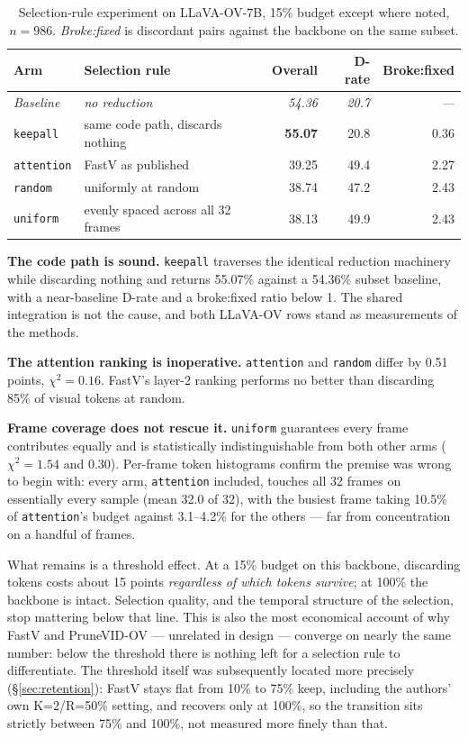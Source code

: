 \documentclass[11pt]{article}
\begin{document}
\begin{table}[H]
  \centering
  \small
  \caption{Selection-rule experiment on LLaVA-OV-7B, 15\% budget except
  where noted, $n=986$. \emph{Broke:fixed} is discordant pairs against the
  backbone on the same subset.}
  \label{tab:selection}
  \begin{tabular}{llrrr}
    \toprule
    Arm & Selection rule & Overall & D-rate & Broke:fixed \\
    \midrule
    \textit{Baseline} & \textit{no reduction} & \textit{54.36} & \textit{20.7} & \textit{---} \\
    \texttt{keepall} & same code path, discards nothing & \textbf{55.07} & 20.8 & 0.36 \\
    \midrule
    \texttt{attention} & FastV as published & 39.25 & 49.4 & 2.27 \\
    \texttt{random} & uniformly at random & 38.74 & 47.2 & 2.43 \\
    \texttt{uniform} & evenly spaced across all 32 frames & 38.13 & 49.9 & 2.43 \\
    \bottomrule
  \end{tabular}
\end{table}

\textbf{The code path is sound.} \texttt{keepall} traverses the identical
reduction machinery while discarding nothing and returns 55.07\% against a
54.36\% subset baseline, with a near-baseline D-rate and a broke:fixed ratio
below 1. The shared integration is not the cause, and both LLaVA-OV rows
stand as measurements of the methods.

\textbf{The attention ranking is inoperative.} \texttt{attention} and
\texttt{random} differ by 0.51 points, $\chi^2 = 0.16$. FastV's layer-2
ranking performs no better than discarding 85\% of visual tokens at random.

\textbf{Frame coverage does not rescue it.} \texttt{uniform} guarantees
every frame contributes equally and is statistically indistinguishable from
both other arms ($\chi^2 = 1.54$ and $0.30$). Per-frame token histograms
confirm the premise was wrong to begin with: every arm, \texttt{attention}
included, touches all 32 frames on essentially every sample (mean 32.0 of
32), with the busiest frame taking 10.5\% of \texttt{attention}'s budget
against 3.1--4.2\% for the others --- far from concentration on a handful of
frames.

What remains is a threshold effect. At a 15\% budget on this backbone,
discarding tokens costs about 15 points \emph{regardless of which tokens
survive}; at 100\% the backbone is intact. Selection quality, and the
temporal structure of the selection, stop mattering below that line. This is
also the most economical account of why FastV and PruneVID-OV --- unrelated
in design --- converge on nearly the same number: below the threshold there
is nothing left for a selection rule to differentiate. The threshold itself
was subsequently located more precisely (\S\ref{sec:retention}): FastV stays
flat from 10\% to 75\% keep, including the authors' own K=2/R=50\% setting,
and recovers only at 100\%, so the transition sits strictly between 75\% and
100\%, not measured more finely than that.
\end{document}

